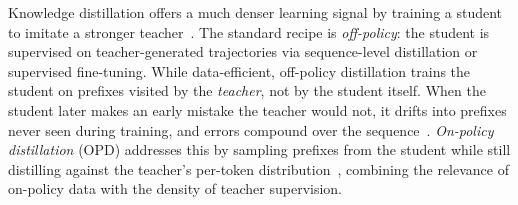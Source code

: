 Knowledge distillation offers a much denser learning signal by training a student
to imitate a stronger teacher~\citep{hinton2015distilling,kim2016sequence}. The
standard recipe is \emph{off-policy}: the student is supervised on teacher-generated
trajectories via sequence-level distillation or supervised fine-tuning. While
data-efficient, off-policy distillation trains the student on prefixes visited by
the \emph{teacher}, not by the student itself. When the student later makes an early
mistake the teacher would not, it drifts into prefixes never seen during training,
and errors compound over the sequence~\citep{ross2011reduction,ranzato2016sequence}.
\emph{On-policy distillation} (OPD) addresses this by sampling prefixes from the
student while still distilling against the teacher's per-token
distribution~\citep{gu2024minillm,agarwal2024gkd,thinkingmachines2025onpolicy},
combining the relevance of on-policy data with the density of teacher supervision.

